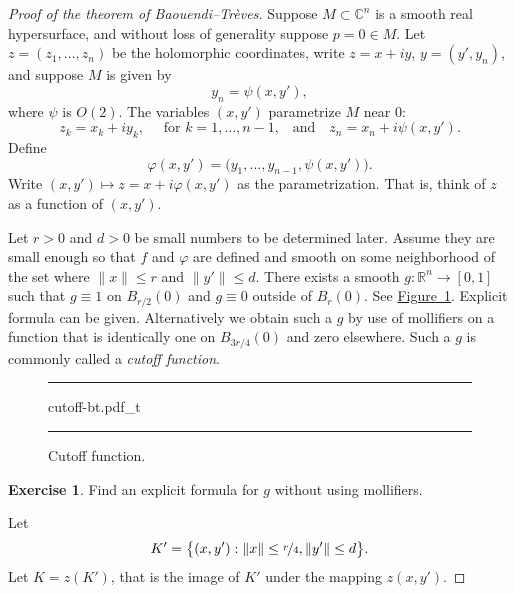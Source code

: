 \documentclass[12pt,openany]{book}
\newcommand{\snorm}[1]{\lVert {#1} \rVert}
\newcommand{\C}{{\mathbb{C}}}
\newcommand{\R}{{\mathbb{R}}}
\newcommand{\myindex}[1]{#1\index{#1}}
\theoremstyle{plain}
\theoremstyle{remark}
\theoremstyle{definition}
\newenvironment{exbox}{%
    \def\FrameCommand{\vrule width 1pt \relax\hspace{10pt}}%
    \MakeFramed{\advance\hsize-\width\FrameRestore}%
}{%
    \endMakeFramed
}
\newenvironment{myfig}{%
\begin{figure}[h!t]
\noindent\rule{\textwidth}{0.5pt}\vspace{12pt}\par\centering}%
{\par\noindent\rule{\textwidth}{0.5pt}
\end{figure}}
\theoremstyle{exercise}
\newtheorem{exercise}{Exercise}[section]
\theoremstyle{example}
\newcommand{\figureref}[1]{\hyperref[#1]{Figure~\ref*{#1}}}
\begin{document}
\begin{proof}[Proof of the theorem of Baouendi--Tr{\`e}ves]
Suppose $M \subset \C^n$ is a smooth real hypersurface, and without loss
of generality suppose $p=0 \in M$.
Let $z=(z_1,\ldots,z_n)$ be the holomorphic coordinates, write $z=x+iy$,
$y=(y',y_n)$, and
suppose $M$ is given by
\begin{equation*}
y_n = \psi(x,y') ,
\end{equation*}
where $\psi$ is $O(2)$.
The variables $(x,y')$ parametrize $M$ near 0:
\begin{equation*}
z_k = x_k+iy_k , \quad \text{ for $k = 1,\ldots,n-1$,} \quad \text{and} \quad
z_n = x_n + i \psi(x,y') .
\end{equation*}
Define
\begin{equation*}
\varphi(x,y') = \bigl(y_1,\ldots,y_{n-1},\psi(x,y')\bigr) .
\end{equation*}
Write $(x,y') \mapsto z = x + i\varphi(x,y')$ as the parametrization.
That is, think of $z$ as a function of $(x,y')$.

Let $r > 0$ and $d > 0$ be small numbers to be determined later.
Assume they are small enough so
that $f$ and $\varphi$ are defined and smooth on some neighborhood of the
set where $\snorm{x} \leq r$ and $\snorm{y'} \leq d$.
There exists a smooth $g \colon \R^n \to [0,1]$ such that $g \equiv 1$ on
$B_{r/2}(0)$ and $g \equiv 0$ outside of $B_{r}(0)$.
See \figureref{fig:cutoff-bt}.
Explicit formula
can be given.  Alternatively we obtain such a $g$ by use of
mollifiers on a function that is identically one on
$B_{3r/4}(0)$ and zero elsewhere.  Such a $g$ is commonly called a
\emph{\myindex{cutoff function}}.

\begin{myfig}
{cutoff-bt.pdf_t}
\caption{Cutoff function.\label{fig:cutoff-bt}}
\end{myfig}

\begin{exbox}
\begin{exercise}
Find an explicit formula for $g$ without using mollifiers.
\end{exercise}
\end{exbox}

Let
\begin{equation*}
K' = \bigl\{ (x,y') : \snorm{x} \leq \nicefrac{r}{4} , \snorm{y'} \leq d
\bigr\} .
\end{equation*}
Let $K = z(K')$, that is the image of $K'$ under the mapping $z(x,y')$.


\end{proof}
\end{document}
